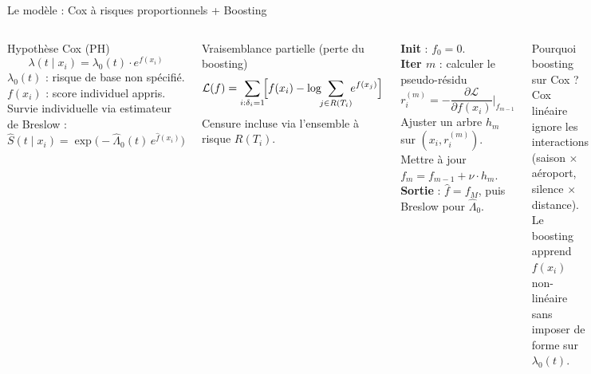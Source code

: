 \documentclass[aspectratio=169,t,11pt]{beamer}
\begin{document}
\begin{frame}[shrink=10]{Le modèle : Cox à risques proportionnels + Boosting}
\vspace{-2pt}
\begin{columns}[T]

\begin{block}{Hypothèse Cox (PH)}
\footnotesize
\[ \lambda(t \mid x_i) = \lambda_0(t) \cdot e^{f(x_i)} \]
$\lambda_0(t)$ : risque de base non spécifié.
$f(x_i)$ : score individuel appris.\\[3pt]
Survie individuelle via estimateur de Breslow :
\[ \hat{S}(t \mid x_i) = \exp\!\bigl(-\hat{\Lambda}_0(t)\,e^{\hat{f}(x_i)}\bigr) \]
\end{block}
\vspace{3pt}
\begin{block}{Vraisemblance partielle (perte du boosting)}
\footnotesize
\[
\mathcal{L}(f) = \sum_{i:\delta_i=1}
\!\Bigl[f(x_i) - \log\!\!\sum_{j \in R(T_i)}\!\!e^{f(x_j)}\Bigr]
\]
Censure incluse via l'ensemble à risque $R(T_i)$.
\end{block}

\begin{tcolorbox}[mybox,colback=metBlue!5,colframe=metBlue,
  title={Boucle de boosting}]
\footnotesize
\textbf{Init} : $f_0 = 0$.\\[2pt]
\textbf{Iter $m$} : calculer le pseudo-résidu
\[r_i^{(m)} = -\frac{\partial\mathcal{L}}{\partial f(x_i)}\Big|_{f_{m-1}}\]
Ajuster un arbre $h_m$ sur $(x_i, r_i^{(m)})$.
Mettre à jour $f_m = f_{m-1} + \nu \cdot h_m$.\\[2pt]
\textbf{Sortie} : $\hat{f} = f_M$, puis Breslow pour $\hat{\Lambda}_0$.
\end{tcolorbox}
\vspace{3pt}
\begin{exampleblock}{Pourquoi boosting sur Cox ?}
\footnotesize
Cox linéaire ignore les interactions (saison $\times$ aéroport,
silence $\times$ distance). Le boosting apprend $f(x_i)$
non-linéaire sans imposer de forme sur $\lambda_0(t)$.
\end{exampleblock}
\end{columns}
\end{frame}
\end{document}
